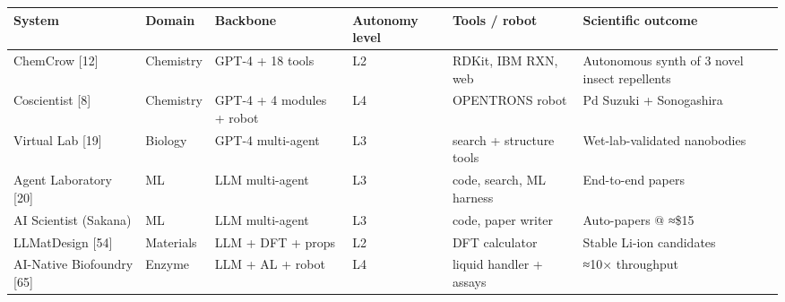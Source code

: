 {\def\LTcaptype{none} %
\begin{longtable}[]{@{}
  >{\raggedright\arraybackslash}p{}
  >{\raggedright\arraybackslash}p{}
  >{\raggedright\arraybackslash}p{}
  >{\raggedright\arraybackslash}p{}
  >{\raggedright\arraybackslash}p{}
  >{\raggedright\arraybackslash}p{}@{}}
\toprule\noalign{}
\begin{minipage}[b]{\linewidth}\raggedright
System
\end{minipage} & \begin{minipage}[b]{\linewidth}\raggedright
Domain
\end{minipage} & \begin{minipage}[b]{\linewidth}\raggedright
Backbone
\end{minipage} & \begin{minipage}[b]{\linewidth}\raggedright
Autonomy level
\end{minipage} & \begin{minipage}[b]{\linewidth}\raggedright
Tools / robot
\end{minipage} & \begin{minipage}[b]{\linewidth}\raggedright
Scientific outcome
\end{minipage} \\
\midrule\noalign{}
\endhead
\bottomrule\noalign{}
\endlastfoot
ChemCrow {[}12{]} & Chemistry & GPT-4 + 18 tools & L2 & RDKit, IBM RXN, web & Autonomous synth of 3 novel insect repellents \\
Coscientist {[}8{]} & Chemistry & GPT-4 + 4 modules + robot & L4 & OPENTRONS robot & Pd Suzuki + Sonogashira \\
Virtual Lab {[}19{]} & Biology & GPT-4 multi-agent & L3 & search + structure tools & Wet-lab-validated nanobodies \\
Agent Laboratory {[}20{]} & ML & LLM multi-agent & L3 & code, search, ML harness & End-to-end papers \\
AI Scientist (Sakana) & ML & LLM multi-agent & L3 & code, paper writer & Auto-papers @ ≈\$15 \\
LLMatDesign {[}54{]} & Materials & LLM + DFT + props & L2 & DFT calculator & Stable Li-ion candidates \\
AI-Native Biofoundry {[}65{]} & Enzyme & LLM + AL + robot & L4 & liquid handler + assays & ≈10× throughput \\

\end{longtable}}
